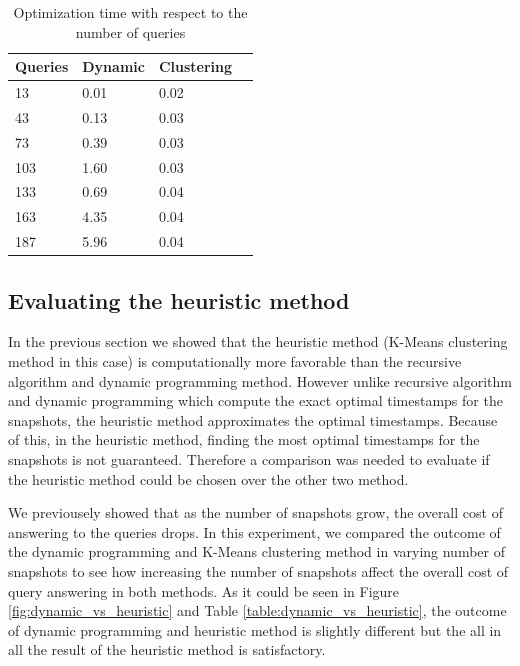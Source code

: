 \begin {center}
\begin{table}
	\centering
	\caption{Optimization time with respect to the number of queries}
	\label {table:variable_queries_2}
	\begin{tabular}{p{2cm}p{3cm}p{3cm}p{3cm}}
		\hline
		Queries  & Dynamic  & Clustering \\ \hline
		13 & 0.01  & 0.02  \\  
		43 & 0.13  & 0.03  \\
		73 & 0.39  & 0.03  \\
		103 & 1.60  & 0.03  \\
		133 & 0.69  & 0.04 \\
		163 & 4.35  & 0.04  \\
		187 & 5.96  & 0.04  \\\hline
	\end{tabular}
\end{table}
\end{center}

\subsection{Evaluating the heuristic method}
In the previous section we showed that the heuristic method (K-Means clustering method in this case) is computationally more favorable than the recursive algorithm and dynamic programming method. However unlike recursive algorithm and dynamic programming which compute the exact optimal timestamps for the snapshots, the heuristic method approximates the optimal timestamps. Because of this, in the heuristic method, finding the most optimal timestamps for the snapshots is not guaranteed. Therefore a comparison was needed to evaluate if the heuristic method could be chosen over the other two method.

We previousely showed that as the number of snapshots grow, the overall cost of answering to the queries drops. In this experiment, we compared the outcome of the dynamic programming and K-Means clustering method in varying number of snapshots to see how increasing the number of snapshots affect the overall cost of query answering in both methods. As it could be seen in Figure \ref{fig:dynamic_vs_heuristic} and Table \ref{table:dynamic_vs_heuristic}, the outcome of dynamic programming and heuristic method is slightly different but the all in all the result of the heuristic method is satisfactory.

